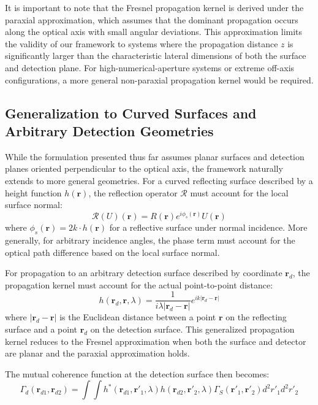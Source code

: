 \documentclass[a4paper,12pt]{article}
\begin{document}
It is important to note that the Fresnel propagation kernel is derived under the paraxial approximation, which assumes 
that the dominant propagation occurs along the optical axis with small angular deviations. This approximation limits 
the validity of our framework to systems where the propagation distance $z$ is significantly larger than the characteristic 
lateral dimensions of both the surface and detection plane. For high-numerical-aperture systems or extreme off-axis 
configurations, a more general non-paraxial propagation kernel would be required.

\subsection{Generalization to Curved Surfaces and Arbitrary Detection Geometries}

While the formulation presented thus far assumes planar surfaces and detection planes oriented perpendicular to the optical axis, the framework naturally extends to more general geometries. For a curved reflecting surface described by a height function $h(\bm{r})$, the reflection operator $\mathcal{R}$ must account for the local surface normal:
\begin{equation}
\mathcal{R}(U)(\bm{r}) = R(\bm{r})e^{i\phi_s(\bm{r})}U(\bm{r})
\end{equation}
where $\phi_s(\bm{r}) = 2k \cdot h(\bm{r})$ for a reflective surface under normal incidence. More generally, for arbitrary incidence angles, the phase term must account for the optical path difference based on the local surface normal.

For propagation to an arbitrary detection surface described by coordinate $\bm{r}_d$, the propagation kernel must account for the actual point-to-point distance:
\begin{equation}
h(\bm{r}_d, \bm{r}, \lambda) = \frac{1}{i\lambda |\bm{r}_d - \bm{r}|} e^{ik|\bm{r}_d - \bm{r}|}
\end{equation}
where $|\bm{r}_d - \bm{r}|$ is the Euclidean distance between a point $\bm{r}$ on the reflecting surface and a point $\bm{r}_d$ on the detection surface. This generalized propagation kernel reduces to the Fresnel approximation when both the surface and detector are planar and the paraxial approximation holds.

The mutual coherence function at the detection surface then becomes:
\begin{equation}
\Gamma_d(\bm{r}_{d1}, \bm{r}_{d2}) = \int\int h^*(\bm{r}_{d1}, \bm{r}'_1, \lambda) h(\bm{r}_{d2}, \bm{r}'_2, \lambda) \Gamma_S(\bm{r}'_1, \bm{r}'_2) d^2r'_1 d^2r'_2
\end{equation}
\end{document}
